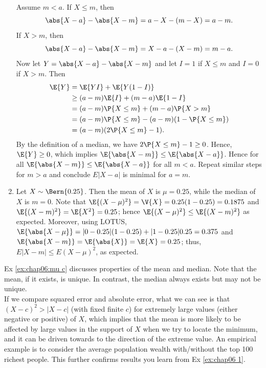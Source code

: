 \begin{exercise}
\begin{solution}
\begin{enumerate}
				Assume $m < a$. If $X \leq m$, then
				\begin{equation*}
					\abs{X - a} - \abs{X - m} = a - X - (m - X) = a - m.
				\end{equation*}
				If $X > m$, then
				\begin{equation*}
					\abs{X - a} - \abs{X - m} = X - a - (X - m) = m - a.
				\end{equation*}
				Now let $Y = \abs{X - a} - \abs{X - m}$ and let $I = 1$ if $X \leq m$ and $I = 0$ if $X > m$. Then
				\begin{align*}
					\E{Y} & = \E{YI} + \E{Y(1 - I)} \\
					& \geq (a - m) \E{I}	+ (m - a) \E{1-I} \\
					& = (a - m) \P{X \leq m} + (m - a) \P{X > m} \\
					& = (a - m) \P{X \leq m} - (a - m) (1 - \P{X \leq m}) \\
					& = (a - m) (2 \P{X \leq m} - 1).
				\end{align*}
				By the definition of a median, we have $2 \P{X \leq m} - 1 \geq 0$. Hence, $\E{Y} \geq 0$, which implies $\E{\abs{X - m}} \leq \E{\abs{X - a}}$. Hence for all $\E{\abs{X - m}} \leq \E{\abs{X - a}}$ for all $m < a$. Repeat similar steps for $m > a$ and conclude $E|X - a|$ is minimal for $a = m$.
				\item Let $X \sim \Bern{0.25}$. Then the mean of $X$ is $\mu = 0.25$, while the median of $X$ is $m = 0$. Note that $\E{(X - \mu)^2} = \V{X} = 0.25(1 - 0.25) = 0.1875$ and $\E{(X - m)^2} = \E{X^2} = 0.25$; hence $\E{(X - \mu)^2} \leq \E{(X - m)^2}$ as expected. Moreover, using LOTUS, $\E{\abs{X - \mu}} = |0 - 0.25|(1 - 0.25) + |1 - 0.25|0.25 = 0.375$ and $\E{\abs{X - m}} = \E{\abs{X}} = \E{X} = 0.25$; thus, $E|X - m| \leq E(X - \mu)^2$, as expected.
			\end{enumerate}
		\end{solution}
	\end{exercise}
	
	\begin{remark}
		Ex \ref{ex:chap06:mu c} discusses properties of the mean and median. Note that the mean, if it exists, is unique. In contrast, the median always exists but may not be unique.  
		~\\
		If we compare squared error and absolute error, what we can see is that $(X-c)^2>|X-c|$ (with fixed finite $c$) for extremely large values (either negative or positive) of $X$, which implies that the mean is more likely to be affected by large values in the support of $X$ when we try to locate the minimum, and it can be driven towards to the direction of the extreme value. An empirical example is to consider the average population wealth with/without the top 100 richest people. This further confirms results you learn from Ex \ref{ex:chap06 1}.  
	\end{remark}	
	
